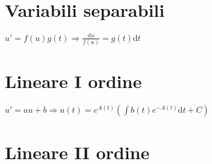\documentclass[11pt,a4paper]{article}
\newcommand{\de}{\mathrm d}
\begin{document}
\section{Variabili separabili}
$u' = f(u) g(t) \Rightarrow \frac{\de u}{f(u)} = g(t) \de t$

\section{Lineare I ordine}
$u' = au + b \Rightarrow u(t) = e^{A(t)} (\int b(t) e^{-A(t)} \de t + C)$

\section{Lineare II ordine}
\end{document}

